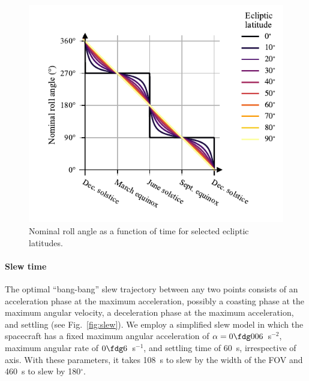 \documentclass[twocolumn,times]{aastex631}
\begin{document}
\begin{figure}
    \includegraphics[width=\columnwidth]{figures/nominal-roll}
    \caption{\label{fig:nominal-roll}Nominal roll angle as a function of time for selected ecliptic latitudes.}
\end{figure}

\paragraph{Slew time}
The optimal ``bang-bang'' slew trajectory between any two points consists of an acceleration phase at the maximum acceleration, possibly a coasting phase at the maximum angular velocity, a deceleration phase at the maximum acceleration, and settling (see Fig.~\ref{fig:slew}). We employ a simplified slew model in which the spacecraft has a fixed maximum angular acceleration of $\alpha=0 \fdg 006$~s$^{-2}$, maximum angular rate of $0 \fdg 6$~s$^{-1}$, and settling time of 60~s, irrespective of axis. With these parameters, it takes 108~s to slew by the width of the \ac{FOV} and 460~s to slew by 180$^\circ$.
\end{document}
